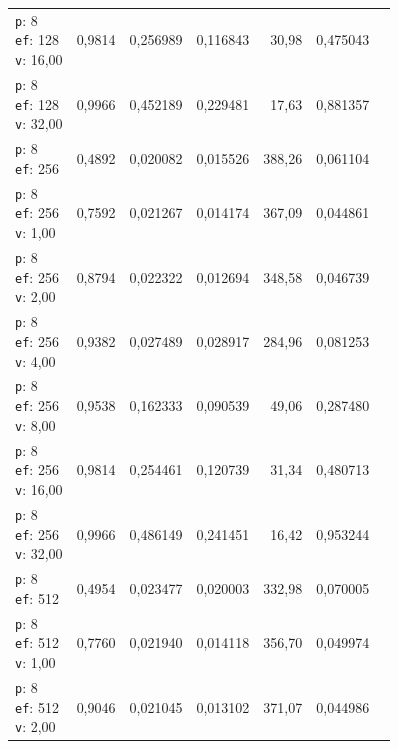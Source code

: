 \begin{table}[htbp]
\begin{tabularx}{\textwidth}{Xrrrrrr}
    \makecell{\texttt{p}: 8\\\texttt{ef}: 128\\\texttt{v}: 16,00} & 0,9814 & 0,256989 & 0,116843 & 30,98 & 0,475043 \\
    \makecell{\texttt{p}: 8\\\texttt{ef}: 128\\\texttt{v}: 32,00} & 0,9966 & 0,452189 & 0,229481 & 17,63 & 0,881357 \\
    \makecell{\texttt{p}: 8\\\texttt{ef}: 256} & 0,4892 & 0,020082 & 0,015526 & 388,26 & 0,061104 \\
    \makecell{\texttt{p}: 8\\\texttt{ef}: 256\\\texttt{v}: 1,00} & 0,7592 & 0,021267 & 0,014174 & 367,09 & 0,044861 \\
    \makecell{\texttt{p}: 8\\\texttt{ef}: 256\\\texttt{v}: 2,00} & 0,8794 & 0,022322 & 0,012694 & 348,58 & 0,046739 \\
    \makecell{\texttt{p}: 8\\\texttt{ef}: 256\\\texttt{v}: 4,00} & 0,9382 & 0,027489 & 0,028917 & 284,96 & 0,081253 \\
    \makecell{\texttt{p}: 8\\\texttt{ef}: 256\\\texttt{v}: 8,00} & 0,9538 & 0,162333 & 0,090539 & 49,06 & 0,287480 \\
    \makecell{\texttt{p}: 8\\\texttt{ef}: 256\\\texttt{v}: 16,00} & 0,9814 & 0,254461 & 0,120739 & 31,34 & 0,480713 \\
    \makecell{\texttt{p}: 8\\\texttt{ef}: 256\\\texttt{v}: 32,00} & 0,9966 & 0,486149 & 0,241451 & 16,42 & 0,953244 \\
    \makecell{\texttt{p}: 8\\\texttt{ef}: 512} & 0,4954 & 0,023477 & 0,020003 & 332,98 & 0,070005 \\
    \makecell{\texttt{p}: 8\\\texttt{ef}: 512\\\texttt{v}: 1,00} & 0,7760 & 0,021940 & 0,014118 & 356,70 & 0,049974 \\
    \makecell{\texttt{p}: 8\\\texttt{ef}: 512\\\texttt{v}: 2,00} & 0,9046 & 0,021045 & 0,013102 & 371,07 & 0,044986 \\

\end{tabularx}
\end{table}
